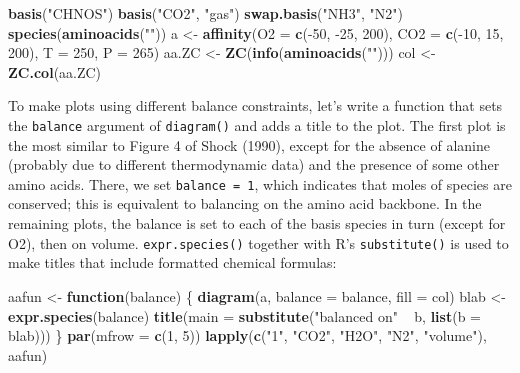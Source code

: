 \documentclass[]{tufte-book}
\newenvironment{Shaded}{}{}
\newcommand{\KeywordTok}[1]{\textcolor[rgb]{0.00,0.44,0.13}{\textbf{#1}}}
\newcommand{\DataTypeTok}[1]{\textcolor[rgb]{0.56,0.13,0.00}{#1}}
\newcommand{\DecValTok}[1]{\textcolor[rgb]{0.25,0.63,0.44}{#1}}
\newcommand{\StringTok}[1]{\textcolor[rgb]{0.25,0.44,0.63}{#1}}
\newcommand{\ControlFlowTok}[1]{\textcolor[rgb]{0.00,0.44,0.13}{\textbf{#1}}}
\newcommand{\OperatorTok}[1]{\textcolor[rgb]{0.40,0.40,0.40}{#1}}
\newcommand{\NormalTok}[1]{#1}
\begin{document}
\begin{Shaded}
\begin{Highlighting}[]
\KeywordTok{basis}\NormalTok{(}\StringTok{"CHNOS"}\NormalTok{)}
\KeywordTok{basis}\NormalTok{(}\StringTok{"CO2"}\NormalTok{, }\StringTok{"gas"}\NormalTok{)}
\KeywordTok{swap.basis}\NormalTok{(}\StringTok{"NH3"}\NormalTok{, }\StringTok{"N2"}\NormalTok{)}
\KeywordTok{species}\NormalTok{(}\KeywordTok{aminoacids}\NormalTok{(}\StringTok{""}\NormalTok{))}
\NormalTok{a <-}\StringTok{ }\KeywordTok{affinity}\NormalTok{(}\DataTypeTok{O2 =} \KeywordTok{c}\NormalTok{(}\OperatorTok{-}\DecValTok{50}\NormalTok{, }\OperatorTok{-}\DecValTok{25}\NormalTok{, }\DecValTok{200}\NormalTok{), }\DataTypeTok{CO2 =} \KeywordTok{c}\NormalTok{(}\OperatorTok{-}\DecValTok{10}\NormalTok{, }\DecValTok{15}\NormalTok{, }\DecValTok{200}\NormalTok{), }\DataTypeTok{T =} \DecValTok{250}\NormalTok{, }\DataTypeTok{P =} \DecValTok{265}\NormalTok{)}
\NormalTok{aa.ZC <-}\StringTok{ }\KeywordTok{ZC}\NormalTok{(}\KeywordTok{info}\NormalTok{(}\KeywordTok{aminoacids}\NormalTok{(}\StringTok{""}\NormalTok{)))}
\NormalTok{col <-}\StringTok{ }\KeywordTok{ZC.col}\NormalTok{(aa.ZC)}
\end{Highlighting}
\end{Shaded}

To make plots using different balance constraints, let's write a
function that sets the \texttt{balance} argument of {\texttt{diagram()}}
and adds a title to the plot. The first plot is the most similar to
Figure 4 of Shock (1990), except for the absence of alanine (probably
due to different thermodynamic data) and the presence of some other
amino acids. There, we set \texttt{balance\ =\ 1}, which indicates that
moles of species are conserved; this is equivalent to balancing on the
amino acid backbone. In the remaining plots, the balance is set to each
of the basis species in turn (except for O2), then on volume.
{\texttt{expr.species()}} together with R's \texttt{substitute()} is
used to make titles that include formatted chemical formulas:

\begin{Shaded}
\begin{Highlighting}[]
\NormalTok{aafun <-}\StringTok{ }\ControlFlowTok{function}\NormalTok{(balance) \{}
  \KeywordTok{diagram}\NormalTok{(a, }\DataTypeTok{balance =}\NormalTok{ balance, }\DataTypeTok{fill =}\NormalTok{ col)}
\NormalTok{  blab <-}\StringTok{ }\KeywordTok{expr.species}\NormalTok{(balance)}
  \KeywordTok{title}\NormalTok{(}\DataTypeTok{main =} \KeywordTok{substitute}\NormalTok{(}\StringTok{"balanced on"} \OperatorTok{~}\StringTok{ }\NormalTok{b, }\KeywordTok{list}\NormalTok{(}\DataTypeTok{b =}\NormalTok{ blab)))}
\NormalTok{\}}
\KeywordTok{par}\NormalTok{(}\DataTypeTok{mfrow =} \KeywordTok{c}\NormalTok{(}\DecValTok{1}\NormalTok{, }\DecValTok{5}\NormalTok{))}
\KeywordTok{lapply}\NormalTok{(}\KeywordTok{c}\NormalTok{(}\StringTok{"1"}\NormalTok{, }\StringTok{"CO2"}\NormalTok{, }\StringTok{"H2O"}\NormalTok{, }\StringTok{"N2"}\NormalTok{, }\StringTok{"volume"}\NormalTok{), aafun)}
\end{Highlighting}
\end{Shaded}
\end{document}
